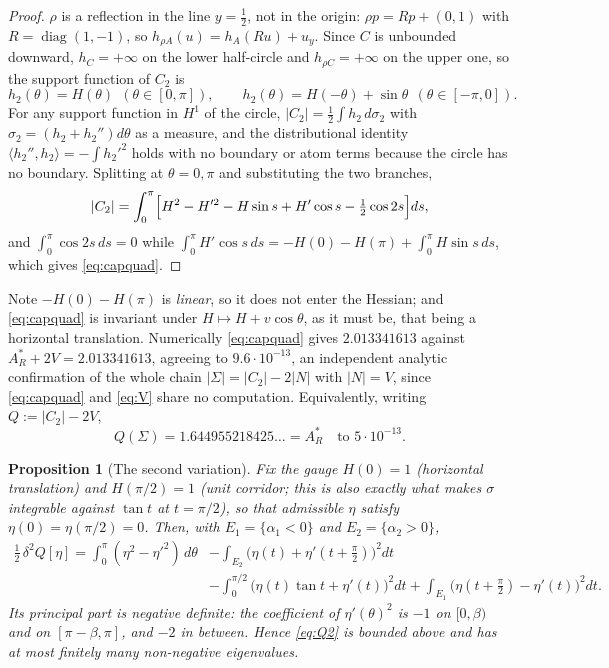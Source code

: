 \documentclass[11pt]{article}
\newtheorem{proposition}[theorem]{Proposition}
\theoremstyle{definition}
\newcommand{\Sig}{\Sigma}
\begin{document}
\begin{proof}
$\rho$ is a reflection in the line $y=\tfrac12$, not in the origin: $\rho p=Rp+(0,1)$
with $R=\operatorname{diag}(1,-1)$, so $h_{\rho A}(u)=h_A(Ru)+u_y$. Since $C$ is
unbounded downward, $h_C=+\infty$ on the lower half-circle and $h_{\rho C}=+\infty$ on
the upper one, so the support function of $C_2$ is
\[
  h_2(\theta)=H(\theta)\ \ (\theta\in[0,\pi]),\qquad
  h_2(\theta)=H(-\theta)+\sin\theta\ \ (\theta\in[-\pi,0]).
\]
For any support function in $H^1$ of the circle, $|C_2|=\tfrac12\int h_2\,d\sigma_2$
with $\sigma_2=(h_2+h_2'')d\theta$ as a measure, and the distributional identity
$\langle h_2'',h_2\rangle=-\int h_2'^2$ holds with no boundary or atom terms because the
circle has no boundary. Splitting at $\theta=0,\pi$ and substituting the two branches,
\[
  |C_2|=\int_0^\pi\Bigl[H^2-H'^2-H\sin s+H'\cos s-\tfrac12\cos2s\Bigr]ds,
\]
and $\int_0^\pi\cos2s\,ds=0$ while
$\int_0^\pi H'\cos s\,ds=-H(0)-H(\pi)+\int_0^\pi H\sin s\,ds$, which gives
\eqref{eq:capquad}.
\end{proof}

Note $-H(0)-H(\pi)$ is \emph{linear}, so it does not enter the Hessian; and
\eqref{eq:capquad} is invariant under $H\mapsto H+v\cos\theta$, as it must be, that
being a horizontal translation. Numerically \eqref{eq:capquad} gives
$2.013341613$ against $A_R^\ast+2V=2.013341613$, agreeing to
$9.6\cdot10^{-13}$, an independent analytic confirmation of the whole chain
$|\Sig|=|C_2|-2|N|$ with $|N|=V$, since \eqref{eq:capquad} and \eqref{eq:V} share no
computation. Equivalently, writing $Q:=|C_2|-2V$,
\begin{equation}\label{eq:Qtight}
  Q(\Sig)=1.644955218425\ldots=A_R^\ast\quad\text{to }5\cdot10^{-13}.
\end{equation}

\begin{proposition}[The second variation]\label{prop:hess}
Fix the gauge $H(0)=1$ (horizontal translation) and $H(\pi/2)=1$ (unit corridor; this
is also exactly what makes $\sigma$ integrable against $\tan t$ at $t=\pi/2$), so that
admissible $\eta$ satisfy $\eta(0)=\eta(\pi/2)=0$. Then, with
$E_1=\{\alpha_1<0\}$ and $E_2=\{\alpha_2>0\}$,
\begin{equation}\label{eq:Q2}
\begin{aligned}
  \tfrac12\,\delta^2Q[\eta]
  =\int_0^\pi(\eta^2-\eta'^2)\,d\theta
  &-\int_{E_2}\bigl(\eta(t)+\eta'(t+\tfrac\pi2)\bigr)^2dt\\
  &-\int_0^{\pi/2}\bigl(\eta(t)\tan t+\eta'(t)\bigr)^2dt
   +\int_{E_1}\bigl(\eta(t+\tfrac\pi2)-\eta'(t)\bigr)^2dt.
\end{aligned}
\end{equation}
Its principal part is negative definite: the coefficient of $\eta'(\theta)^2$ is $-1$ on
$[0,\beta)$ and on $[\pi-\beta,\pi]$, and $-2$ in between. Hence \eqref{eq:Q2} is
bounded above and has at most finitely many non-negative eigenvalues.
\end{proposition}
\end{document}
